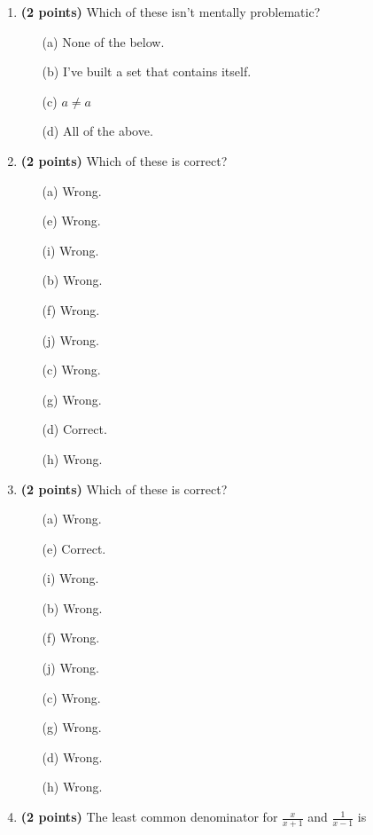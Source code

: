 \documentclass[12pt]{amsart}
\begin{document}
\newpage
\begin{enumerate}
\item {\bf (2 points)} 
 Which of these isn't mentally problematic?

\begin{minipage}[t]{1.0\linewidth}\begin{itemize}\item[(a)]  None of the below.  \item[(b)]  I've built a set that contains itself. \item[(c)]  $a \neq a$ \item[(d)]   All of the above. \end{itemize}\end{minipage} \vfill 
\item {\bf (2 points)} 
 Which of these is correct?

\begin{minipage}[t]{1.0\linewidth}\begin{multicols}{4}\begin{itemize}\item[(a)]  Wrong. \item[(e)]  Wrong. \item[(i)]  Wrong. \item[(b)]  Wrong. \item[(f)]  Wrong. \item[(j)]  Wrong. \item[(c)]  Wrong. \item[(g)]  Wrong. \item[] \item[(d)]  Correct. \item[(h)]  Wrong. \item[] \end{itemize}\end{multicols}\end{minipage} \vfill 
\item {\bf (2 points)} 
 Which of these is correct?

\begin{minipage}[t]{1.0\linewidth}\begin{multicols}{4}\begin{itemize}\item[(a)]  Wrong. \item[(e)]  Correct. \item[(i)]  Wrong. \item[(b)]  Wrong. \item[(f)]  Wrong. \item[(j)]  Wrong. \item[(c)]  Wrong. \item[(g)]  Wrong. \item[] \item[(d)]  Wrong. \item[(h)]  Wrong. \item[] \end{itemize}\end{multicols}\end{minipage} \vfill 
\item {\bf (2 points)} 
 The least common denominator for $\displaystyle \frac{x}{x+1}$ and $\displaystyle \frac{1}{x-1}$ is \vspace{.2cm}


\end{enumerate}
\end{document}
